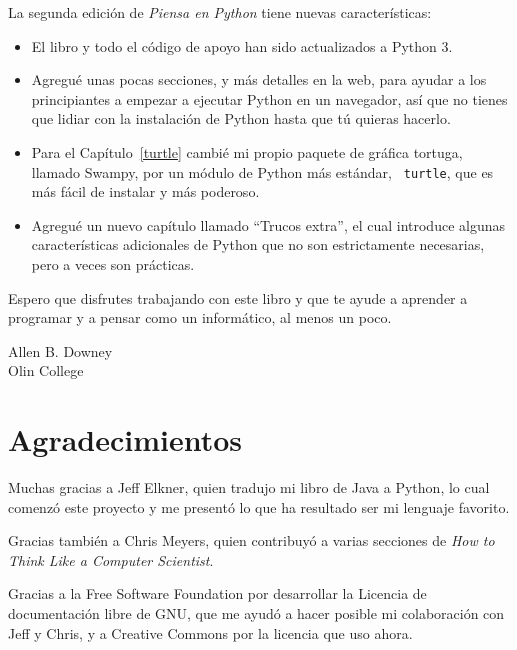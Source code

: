 \documentclass[10pt]{book}
\begin{document}
La segunda edición de {\em Piensa en Python} tiene nuevas características:

\begin{itemize}

\item El libro y todo el código de apoyo han sido actualizados a Python 3.

\item Agregué unas pocas secciones, y más detalles en la web, para ayudar a
los principiantes a empezar a ejecutar Python en un navegador, así que no
tienes que lidiar con la instalación de Python hasta que tú quieras hacerlo.

\item Para el Capítulo~\ref{turtle} cambié mi propio paquete de gráfica
  tortuga, llamado Swampy, por un módulo de Python más estándar, {\tt
    turtle}, que es más fácil de instalar y más poderoso.

\item Agregué un nuevo capítulo llamado ``Trucos extra'', el cual introduce
algunas características adicionales de Python que no son estrictamente
necesarias, pero a veces son prácticas.

\end{itemize}

Espero que disfrutes trabajando con este libro y que te ayude a aprender
a programar y a pensar como un informático, al menos un poco.


Allen B. Downey \\

Olin College \\


\section*{Agradecimientos}

Muchas gracias a Jeff Elkner, quien
tradujo mi libro de Java a Python, lo cual comenzó este
proyecto y me presentó lo que ha resultado ser mi
lenguaje favorito.

Gracias también a Chris Meyers, quien contribuyó a varias secciones
de {\em How to Think Like a Computer Scientist}.

Gracias a la Free Software Foundation por desarrollar
la Licencia de documentación libre de GNU, que me ayudó
a hacer posible mi colaboración con Jeff y Chris, y a Creative
Commons por la licencia que uso ahora.
\end{document}
